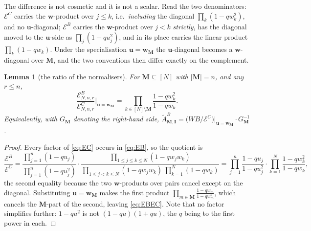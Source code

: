 \documentclass[11pt]{article}
\theoremstyle{plain}
\newtheorem{lem}[thm]{Lemma}
\theoremstyle{definition}
\theoremstyle{remark}
\theoremstyle{plain}
\newcommand{\bI}{\mathbf{I}}
\newcommand{\bM}{\mathbf{M}}
\newcommand{\bu}{\mathbf{u}}
\newcommand{\bw}{\mathbf{w}}
\newcommand{\At}{\widetilde{A}}
\begin{document}
The difference is not cosmetic and it is not a scalar.  Read the two
denominators: $\mathcal{E}^C$ carries the $\bw$-product over $j\le k$, i.e.\
\emph{including} the diagonal $\prod_k(1-qw_k^2)$, and no $\bu$-diagonal;
$\mathcal{E}^B$ carries the $\bw$-product over $j<k$ \emph{strictly}, has the
diagonal moved to the $\bu$-side as $\prod_j(1-qu_j^2)$, and in its place
carries the linear product $\prod_k(1-qw_k)$.  Under the specialisation
$\bu=\bw_{\bM}$ the $\bu$-diagonal becomes a $\bw$-diagonal over $\bM$, and the
two conventions then differ exactly on the complement.

\begin{lem}[the ratio of the normalisers]\label{lem:EBEC}
For $\bM\subseteq[N]$ with $|\bM|=n$, and any $r\le n$,
\begin{equation}
\frac{\mathcal{E}^B_{N,n,r}}{\mathcal{E}^C_{N,n,r}}\bigg|_{\bu=\bw_{\bM}}
=\prod_{k\in[N]\setminus\bM}\frac{1-qw_k^2}{1-qw_k}.
\label{eq:EBEC}
\end{equation}
Equivalently, with $G_{\bM}$ denoting the right-hand side,
$\At^{B}_{\bM,\bI}=\bigl(WB/\mathcal{E}^C\bigr)\big|_{\bu=\bw_{\bM}}\cdot
G_{\bM}^{-1}$.
\end{lem}

\begin{proof}
Every factor of \eqref{eq:EC} occurs in \eqref{eq:EB}, so the quotient is
\[
\frac{\mathcal{E}^B}{\mathcal{E}^C}
=\frac{\prod_{j=1}^n(1-qu_j)}{\prod_{j=1}^n(1-qu_j^2)}\cdot
 \frac{\prod_{1\le j\le k\le N}(1-qw_jw_k)}
      {\prod_{1\le j<k\le N}(1-qw_jw_k)\ \prod_{k=1}^N(1-qw_k)}
=\prod_{j=1}^n\frac{1-qu_j}{1-qu_j^2}\cdot
 \prod_{k=1}^N\frac{1-qw_k^2}{1-qw_k},
\]
the second equality because the two $\bw$-products over pairs cancel except on
the diagonal.  Substituting $\bu=\bw_{\bM}$ makes the first product
$\prod_{m\in\bM}\frac{1-qw_m}{1-qw_m^2}$, which cancels the $\bM$-part of the
second, leaving \eqref{eq:EBEC}.  Note that no factor simplifies further:
$1-qu^2$ is not $(1-qu)(1+qu)$, the $q$ being to the first power in each.
\end{proof}
\end{document}
